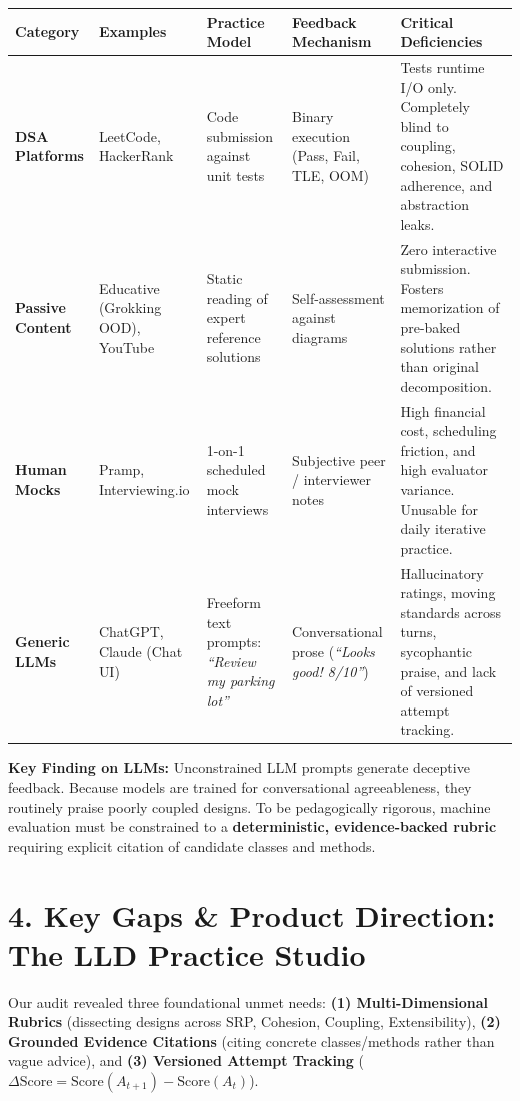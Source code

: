 \documentclass[10pt,a4paper]{article}
\begin{document}
\begin{table}[h!]
\small
\centering
\begin{tabularx}{\textwidth}{l p{3.2cm} p{2.8cm} p{2.8cm} X}
\toprule
\textbf{Category} & \textbf{Examples} & \textbf{Practice Model} & \textbf{Feedback Mechanism} & \textbf{Critical Deficiencies} \\
\midrule
\textbf{DSA Platforms} & LeetCode, HackerRank & Code submission against unit tests & Binary execution (Pass, Fail, TLE, OOM) & Tests runtime I/O only. Completely blind to coupling, cohesion, SOLID adherence, and abstraction leaks. \\
\addlinespace[2pt]
\textbf{Passive Content} & Educative (Grokking OOD), YouTube & Static reading of expert reference solutions & Self-assessment against diagrams & Zero interactive submission. Fosters memorization of pre-baked solutions rather than original decomposition. \\
\addlinespace[2pt]
\textbf{Human Mocks} & Pramp, Interviewing.io & 1-on-1 scheduled mock interviews & Subjective peer / interviewer notes & High financial cost, scheduling friction, and high evaluator variance. Unusable for daily iterative practice. \\
\addlinespace[2pt]
\textbf{Generic LLMs} & ChatGPT, Claude (Chat UI) & Freeform text prompts: \textit{``Review my parking lot''} & Conversational prose (\textit{``Looks good! 8/10''}) & Hallucinatory ratings, moving standards across turns, sycophantic praise, and lack of versioned attempt tracking. \\
\bottomrule
\end{tabularx}
\end{table}

\vspace{-0.8em}
\begin{tcolorbox}
\textbf{Key Finding on LLMs:} Unconstrained LLM prompts generate deceptive feedback. Because models are trained for conversational agreeableness, they routinely praise poorly coupled designs. To be pedagogically rigorous, machine evaluation must be constrained to a \textbf{deterministic, evidence-backed rubric} requiring explicit citation of candidate classes and methods.
\end{tcolorbox}

\section{4. Key Gaps \& Product Direction: The LLD Practice Studio}
Our audit revealed three foundational unmet needs: \textbf{(1) Multi-Dimensional Rubrics} (dissecting designs across SRP, Cohesion, Coupling, Extensibility), \textbf{(2) Grounded Evidence Citations} (citing concrete classes/methods rather than vague advice), and \textbf{(3) Versioned Attempt Tracking} ($\Delta \text{Score} = \text{Score}(A_{t+1}) - \text{Score}(A_t)$).
\end{document}
